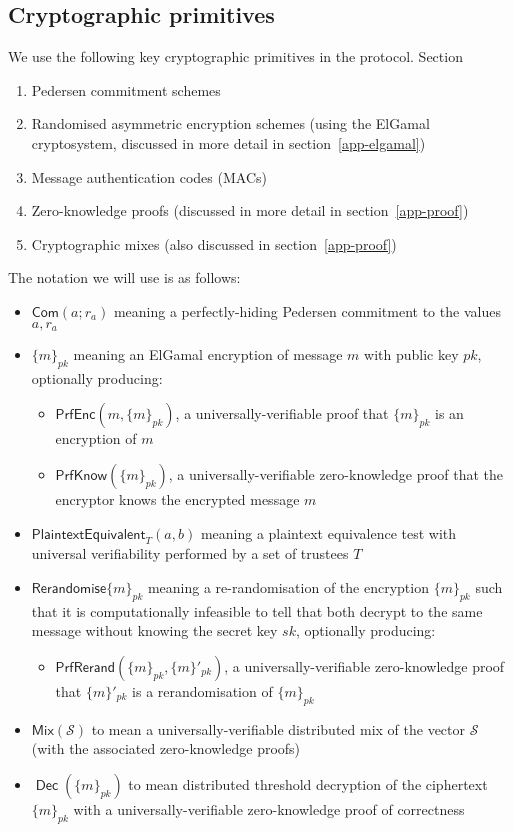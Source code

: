 \documentclass[11pt,twoside,a4paper]{article}
\DeclareMathOperator{\Dec}{\mathsf{Dec}}
\newcommand{\commit}{\mathsf{Com}}
\newcommand{\PrfEnc}{\mathsf{PrfEnc}}
\newcommand{\PrfKnow}{\mathsf{PrfKnow}}
\newcommand{\rerand}{\mathsf{Rerandomise}}
\newcommand{\PrfRerand}{\mathsf{PrfRerand}}
\newcommand{\pet}{\mathsf{PlaintextEquivalent}}
\theoremstyle{definition}
\newcommand{\Mix}{\mathsf{Mix}}
\begin{document}
\subsection{Cryptographic primitives}
We use the following key cryptographic primitives in the protocol. Section~
\begin{enumerate}
    \item Pedersen commitment schemes
    \item Randomised asymmetric encryption schemes (using the ElGamal cryptosystem, discussed in more detail in section~\ref{app-elgamal})
    \item Message authentication codes (MACs)
    \item Zero-knowledge proofs (discussed in more detail in section~\ref{app-proof})
    \item Cryptographic mixes (also discussed in section~\ref{app-proof})
\end{enumerate}
The notation we will use is as follows:
\begin{itemize}
	\item $\commit(a;r_a)$ meaning a perfectly-hiding Pedersen commitment to the values $a, r_a$
	\item $\{m\}_{pk}$ meaning an ElGamal encryption of message $m$ with public key $pk$, optionally producing:
	\begin{itemize}
		\item $\PrfEnc(m, \{m\}_{pk})$, a universally-verifiable proof that $\{m\}_{pk}$ is an encryption of $m$
		\item $\PrfKnow(\{m\}_{pk})$, a universally-verifiable zero-knowledge proof that the encryptor knows the encrypted message $m$
	\end{itemize}
	\item $\pet_T(a, b)$ meaning a plaintext equivalence test with universal verifiability performed by a set of trustees $T$
	\item $\rerand\{m\}_{pk}$ meaning a re-randomisation of the encryption $\{m\}_{pk}$ such that it is computationally infeasible to tell that both decrypt to the same message without knowing the secret key $sk$, optionally producing:
	\begin{itemize}
		\item $\PrfRerand(\{m\}_{pk}, \{m\}'_{pk})$, a universally-verifiable zero-knowledge proof that $\{m\}'_{pk}$ is a rerandomisation of $\{m\}_{pk}$
	\end{itemize}
	\item $\Mix(\mathcal{S})$ to mean a universally-verifiable distributed mix of the vector $\mathcal{S}$ (with the associated zero-knowledge proofs)
	\item $\Dec(\{m\}_{pk})$ to mean distributed threshold decryption of the ciphertext $\{m\}_{pk}$ with a universally-verifiable zero-knowledge proof of correctness
\end{itemize}
\end{document}
